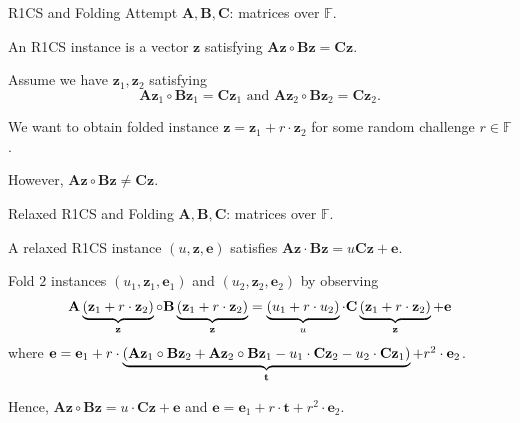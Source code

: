 \begin{frame}{R1CS and Folding Attempt}
	$\mathbf{A}, \mathbf{B}, \mathbf{C}$: matrices over $\mathbb{F}$.
	
	An R1CS instance is a vector $\mathbf{z}$ satisfying $\mathbf{A}\mathbf{z}\circ\mathbf{B}\mathbf{z} = \mathbf{C}\mathbf{z}$.
	
	Assume we have $\mathbf{z}_1, \mathbf{z}_2$ satisfying $$\mathbf{A}\mathbf{z}_1\circ\mathbf{B}\mathbf{z}_1 = \mathbf{C}\mathbf{z}_1 \text{ and } \mathbf{A}\mathbf{z}_2\circ\mathbf{B}\mathbf{z}_2 = \mathbf{C}\mathbf{z}_2.$$
	
	We want to obtain folded instance $\mathbf{z} = \mathbf{z}_1 + r\cdot\mathbf{z}_2$ for some random challenge $r \in \mathbb{F}$.
	
	However, $\mathbf{A}\mathbf{z}\circ \mathbf{B}\mathbf{z} \not= \mathbf{C}\mathbf{z}$.
\end{frame}

\begin{frame}{Relaxed R1CS and Folding}
	$\mathbf{A}, \mathbf{B}, \mathbf{C}$: matrices over $\mathbb{F}$.
	
	A relaxed R1CS instance $(u, \mathbf{z}, \mathbf{e})$ satisfies $\mathbf{A}\mathbf{z}\cdot \mathbf{B}\mathbf{z} = u\mathbf{C}\mathbf{z} + \mathbf{e}$. 
	
	Fold $2$ instances $(u_1, \mathbf{z}_1, \mathbf{e}_1)$ and $(u_2, \mathbf{z}_2, \mathbf{e}_2)$ by observing
	\begin{equation*}
		\begin{aligned}
			\mathbf{A}\underbrace{(\mathbf{z}_1 + r\cdot \mathbf{z}_2)}_{\mathbf{z}} \circ\mathbf{B}\underbrace{(\mathbf{z}_1 + r\cdot \mathbf{z}_2)}_{\mathbf{z}} = \underbrace{(u_1 + r\cdot u_2)}_{u}\cdot\mathbf{C}\underbrace{(\mathbf{z}_1 + r\cdot \mathbf{z}_2)}_{\mathbf{z}} + \mathbf{e}
		\end{aligned}
	\end{equation*}
	where $\mathbf{e} = \mathbf{e}_1 + r\cdot \underbrace{(\mathbf{A}\mathbf{z}_1\circ\mathbf{B}\mathbf{z}_2 + \mathbf{A}\mathbf{z}_2 \circ\mathbf{B}\mathbf{z}_1 - u_1\cdot\mathbf{C}\mathbf{z}_2 - u_2\cdot\mathbf{C}\mathbf{z}_1)}_{\mathbf{t}} + r^2\cdot\mathbf{e}_2$.
	
	Hence, $\mathbf{A}\mathbf{z}\circ\mathbf{B}\mathbf{z} = u\cdot \mathbf{C}\mathbf{z} + \mathbf{e}$ and $\mathbf{e} = \mathbf{e}_1 + r\cdot\mathbf{t} + r^2\cdot\mathbf{e}_2$.
\end{frame}
